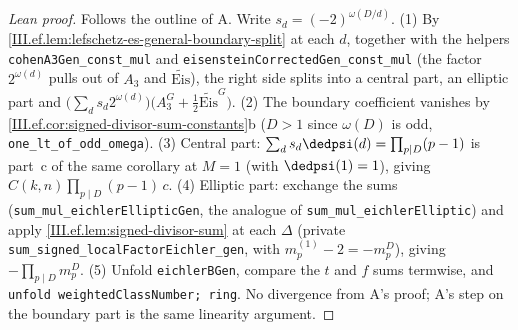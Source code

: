 \begin{proof}[Lean proof]
Follows the outline of A. Write $s_d=(-2)^{\omega(D/d)}$. (1) By \cref{III.ef.lem:lefschetz-es-general-boundary-split} at each $d$, together with the helpers \texttt{cohenA3Gen\_const\_mul} and \texttt{eisensteinCorrectedGen\_const\_mul} (the factor $2^{\omega(d)}$ pulls out of $A_3$ and $\tilde{\mathrm{Eis}}$), the right side splits into a central part, an elliptic part and $\bigl(\sum_d s_d2^{\omega(d)}\bigr)\bigl(A_3^G+\tfrac12\tilde{\mathrm{Eis}}^G\bigr)$. (2) The boundary coefficient vanishes by \cref{III.ef.cor:signed-divisor-sum-constants}b ($D>1$ since $\omega(D)$ is odd, \texttt{one\_lt\_of\_odd\_omega}). (3) Central part: $\sum_ds_d\dedpsi(d)=\prod_{p\mid D}(p-1)$ is part~c of the same corollary at $M=1$ (with $\dedpsi(1)=1$), giving $C(k,n)\prod_{p\mid D}(p-1)\,c$. (4) Elliptic part: exchange the sums (\texttt{sum\_mul\_eichlerEllipticGen}, the analogue of \texttt{sum\_mul\_eichlerElliptic}) and apply \cref{III.ef.lem:signed-divisor-sum} at each $\Delta$ (private \texttt{sum\_signed\_localFactorEichler\_gen}, with $m^{(1)}_p-2=-m^D_p$), giving $-\prod_{p\mid D}m^D_p$. (5) Unfold \texttt{eichlerBGen}, compare the $t$ and $f$ sums termwise, and \texttt{unfold weightedClassNumber; ring}. No divergence from A's proof; A's step on the boundary part is the same linearity argument.
\end{proof}

